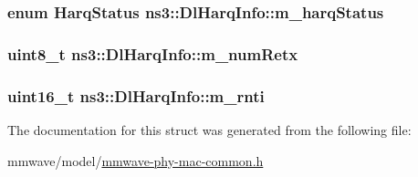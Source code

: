 \subsubsection[{\texorpdfstring{m\+\_\+harq\+Status}{m_harqStatus}}]{\setlength{\rightskip}{0pt plus 5cm}enum {\bf Harq\+Status} ns3\+::\+Dl\+Harq\+Info\+::m\+\_\+harq\+Status}\hypertarget{structns3_1_1DlHarqInfo_a48de905e5f7967ab7181ab2361dc0d9e}{}\label{structns3_1_1DlHarqInfo_a48de905e5f7967ab7181ab2361dc0d9e}
\subsubsection[{\texorpdfstring{m\+\_\+num\+Retx}{m_numRetx}}]{\setlength{\rightskip}{0pt plus 5cm}uint8\+\_\+t ns3\+::\+Dl\+Harq\+Info\+::m\+\_\+num\+Retx}\hypertarget{structns3_1_1DlHarqInfo_a2376c2dc2b319e25d240ed6158e12b6b}{}\label{structns3_1_1DlHarqInfo_a2376c2dc2b319e25d240ed6158e12b6b}
\subsubsection[{\texorpdfstring{m\+\_\+rnti}{m_rnti}}]{\setlength{\rightskip}{0pt plus 5cm}uint16\+\_\+t ns3\+::\+Dl\+Harq\+Info\+::m\+\_\+rnti}\hypertarget{structns3_1_1DlHarqInfo_a31bb88ced4d8996f519112653146f9cb}{}\label{structns3_1_1DlHarqInfo_a31bb88ced4d8996f519112653146f9cb}


The documentation for this struct was generated from the following file\+:\begin{DoxyCompactItemize}
\item 
mmwave/model/\hyperlink{mmwave-phy-mac-common_8h}{mmwave-\/phy-\/mac-\/common.\+h}\end{DoxyCompactItemize}
